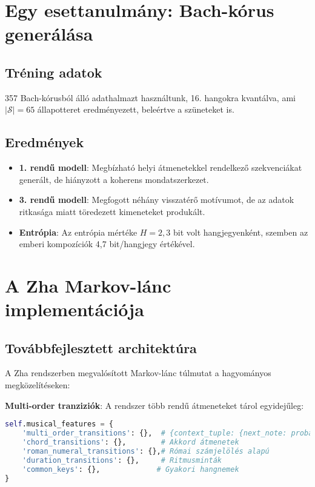 \section{Egy esettanulmány: Bach-kórus generálása}

\subsection{Tréning adatok}

357 Bach-kórusból álló adathalmazt használtunk, 16. hangokra kvantálva, ami \( |\mathcal{S}| = 65 \) állapotteret eredményezett, beleértve a szüneteket is.

\subsection{Eredmények}

\begin{itemize}
    \item \textbf{1. rendű modell}: Megbízható helyi átmenetekkel rendelkező szekvenciákat generált, de hiányzott a koherens mondatszerkezet.
    \item \textbf{3. rendű modell}: Megfogott néhány visszatérő motívumot, de az adatok ritkasága miatt töredezett kimeneteket produkált.
    \item \textbf{Entrópia}: Az entrópia mértéke \( H = 2,3 \) bit volt hangjegyenként, szemben az emberi kompozíciók 4,7 bit/hangjegy értékével.
\end{itemize}


\section{A Zha Markov-lánc implementációja}
\subsection{Továbbfejlesztett architektúra}

A Zha rendszerben megvalósított Markov-lánc túlmutat a hagyományos megközelítéseken:

\textbf{Multi-order tranziziók}: A rendszer több rendű átmeneteket tárol egyidejűleg:
\begin{lstlisting}[language=Python]
self.musical_features = {
    'multi_order_transitions': {},  # {context_tuple: {next_note: probability}}
    'chord_transitions': {},        # Akkord átmenetek
    'roman_numeral_transitions': {},# Római számjelölés alapú
    'duration_transitions': {},     # Ritmusminták
    'common_keys': {},             # Gyakori hangnemek
}
\end{lstlisting}

